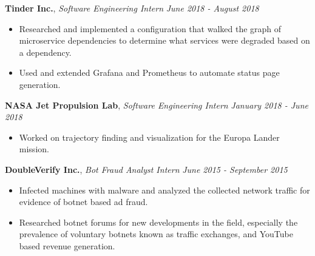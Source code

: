 \documentclass[9pt]{article}
\newenvironment{changemargin}[2]{%
  \begin{list}{}{%
    \setlength{\topsep}{0pt}%
    \setlength{\leftmargin}{#1}%
    \setlength{\rightmargin}{#2}%
    \setlength{\listparindent}{\parindent}%
    \setlength{\itemindent}{\parindent}%
    \setlength{\parsep}{\parskip}%
  }%
  \item[]}{\end{list}
}
\newenvironment{body} {
	\vspace*{-16pt}
	\begin{changemargin}{-0.25in}{-0.5in}
  }	
	{\end{changemargin}
}
\begin{document}
\begin{body}
	\textbf{Tinder Inc.}, \emph{Software Engineering Intern} \hfill \emph{June 2018 - August 2018}\\
	\vspace*{-3pt}
	\begin{itemize} \itemsep -0pt %
		\item Researched and implemented a configuration that walked the graph of
		microservice dependencies to determine what services were degraded based on a dependency.
		\item Used and extended Grafana and Prometheus to automate status page generation.
	\end{itemize}
	\vspace*{-2pt}

	\textbf{NASA Jet Propulsion Lab}, \emph{Software Engineering Intern} \hfill \emph{January 2018 - June 2018}\\
	\vspace*{-3pt}
	\begin{itemize} \itemsep -0pt %
		\item Worked on trajectory finding and visualization for the Europa Lander mission.
	\end{itemize}
	\vspace*{-2pt}

	\textbf{DoubleVerify Inc.}, \emph{Bot Fraud Analyst Intern} \hfill \emph{June 2015 - September 2015}\\
	\vspace*{-3pt}
	\begin{itemize} \itemsep -0pt %
		\item Infected machines with malware and analyzed the collected network traffic for evidence of botnet based ad fraud.
		\item Researched botnet forums for new developments in the field, especially the prevalence of voluntary botnets known as traffic exchanges, and YouTube based revenue generation.
	\end{itemize}
	\vspace*{-2pt}

	\smallskip
	\vspace*{-3pt}
	\vspace*{-5pt}
	\smallskip
\end{body}


\smallskip
\end{document}
